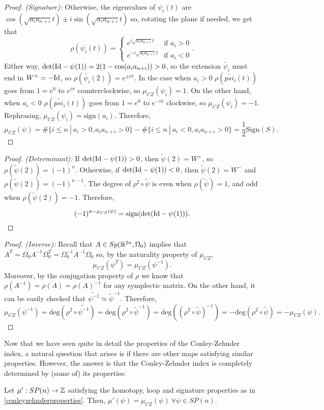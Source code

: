 \begin{proof} {\it (Signature):}
Otherwise, the eigenvalues of $\psi_i(t)$ are $\cos(\sqrt{a_ia_{n+i}}t) \pm i \sin(\sqrt{a_ia_{n+i}}t)$ so, rotating the plane if needed, we get that
\[ \rho(\psi_i(t)) = \left\{ \begin{array}{lc} e^{i \sqrt{a_ia_{n+i}} t} & \text{if } a_i > 0 \\ e^{- i \sqrt{a_ia_{n+i}} t} & \text{if } a_i < 0 \end{array} \right. .\]
Either way, $\text{det}(\text{Id} - \psi(1)) = 2(1-\cos(a_ia_{n+i})) > 0$, so the extension $\widetilde{\psi_i}$ must end in $W^+ = - \text{Id}$, so $\rho(\widetilde{\psi_i}(2)) = e^{\pm i \pi}$. In the case when $a_i > 0$ $\rho(\widetilde{psi_i}(t))$ goes from $1=e^0$ to $e^{i\pi}$ counterclockwise, so $\mu_{CZ}(\psi_i) = 1$. On the other hand, when $a_i < 0$ $\rho(\widetilde{psi_i}(t))$ goes from $1=e^0$ to $e^{-i\pi}$ clockwise, so $\mu_{CZ}(\psi_i) = -1$. Rephrasing, $\mu_{CZ}(\psi_i) = \text{sign}(a_i)$. Therefore,
\[\mu_{CZ}(\psi) = \# \{ i \leq n \ | \ a_i > 0, a_ia_{n+i} > 0 \} - \# \{ i \leq n \ | \ a_i < 0, a_ia_{n+i} > 0 \} = \frac12 \text{Sign}(S) .\]
\end{proof}

\begin{proof} {\it (Determinant):} If $\text{det}(\text{Id} - \psi(1)) > 0$, then $\widetilde{\psi}(2) = W^+$, so $\rho(\widetilde{\psi}(2)) = (-1)^n$. Otherwise, if $\text{det}(\text{Id} - \psi(1)) < 0$, then $\widetilde{\psi}(2) = W^-$ and $\rho(\widetilde{\psi}(2)) = (-1)^{n-1}$. The degree of $\rho^2 \circ \widetilde{\psi}$ is even when $\rho(\widetilde{\psi}) = 1$, and odd when $\rho(\widetilde{\psi}(2)) = -1$. Therefore,
\[(-1)^{n-\mu_{CZ}(\psi)} = \text{sign} ( \text{det}(\text{Id} - \psi(1))) .\]
\end{proof}

\begin{proof} {\it (Inverse):} Recall that $A \in Sp(\mathbb{R}^{2n},\Omega_0)$ implies that $A^T = \Omega_0 A^{-1} \Omega_0^T = \Omega_0^{-1} A^{-1} \Omega_0$ so, by the naturality property of $\mu_{CZ}$,
\[\mu_{CZ}(\psi^T) = \mu_{CZ}(\psi^{-1}) .\]
Moreover, by the conjugation property of $\rho$ we know that $\rho(A^{-1}) = \overline{\rho(A)} = \rho(A)^{-1}$ for any symplectic matrix. On the other hand, it can be easily checked that $\widetilde{\psi^{-1}} \simeq \widetilde{\psi}^{-1}$. Therefore,
\[\mu_{CZ}(\psi^{-1}) = \text{deg}(\rho^2 \circ \widetilde{\psi^{-1}}) = \text{deg}(\rho^2 \circ \widetilde{\psi}^{-1}) = \text{deg}((\rho^2 \circ \widetilde{\psi})^{-1}) = - \text{deg}(\rho^2 \circ \widetilde{\psi}) = - \mu_{CZ}(\psi) .\]
\end{proof}

Now that we have seen quite in detail the properties of the Conley-Zehnder index, a natural question that arises is if there are other maps satisfying similar properties. However, the answer is that the Conley-Zehnder index is completely determined by (some of) its properties:

\begin{theo} Let $\mu' : SP(n) \rightarrow \mathbb{Z}$ satisfying the homotopy, loop and signature properties as in \ref{conleyzehnderproperties}. Then, $\mu'(\psi) = \mu_{CZ}(\psi) \ \forall \psi \in SP(n)$.
\end{theo}
